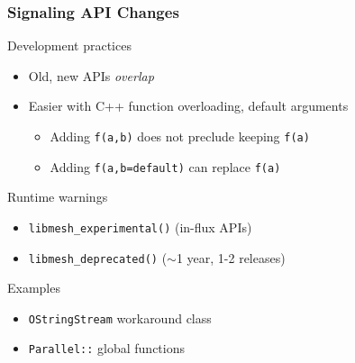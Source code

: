 \documentclass[mathserif]{beamer}
\begin{document}
\begin{frame}
\frametitle{Signaling API Changes}
\begin{block}{Development practices}
\begin{itemize}
	\item Old, new APIs {\emph{overlap}}
	\item Easier with C++ function overloading, default arguments
	\begin{itemize}
		\item Adding \texttt{f(a,b)} does not preclude keeping
			\texttt{f(a)}
		\item Adding \texttt{f(a,b=default)} can replace
			\texttt{f(a)}
	\end{itemize}
\end{itemize}
\end{block}

\begin{block}{Runtime warnings}
\begin{itemize}
	\item {\texttt{libmesh\_experimental()}} \quad (in-flux APIs)
	\item {\texttt{libmesh\_deprecated()}} \quad ($\sim$1 year, 1-2 releases)
\end{itemize}
\end{block}

\begin{block}{Examples}
\begin{itemize}
	\item {\texttt{OStringStream} workaround class}
	\item {\texttt{Parallel::} global functions}
\end{itemize}
\end{block}


\end{frame}
\end{document}
